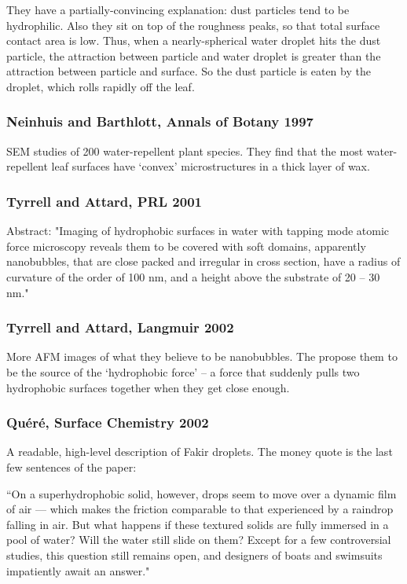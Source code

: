\documentclass{article}
\begin{document}
They have a partially-convincing explanation:  dust particles tend to be hydrophilic.  Also they sit on top of the roughness peaks, so that total surface contact area is low.  Thus, when a nearly-spherical water droplet hits the dust particle, the attraction between particle and water droplet is greater than the attraction between particle and surface. So the dust particle is eaten by the droplet, which rolls rapidly off the leaf.


\subsubsection*{Neinhuis and Barthlott, Annals of Botany 1997}

SEM studies of 200 water-repellent plant species.  They find that the most water-repellent leaf surfaces have `convex' microstructures in a thick layer of wax.


\subsubsection*{Tyrrell and Attard, PRL 2001}

Abstract: "Imaging of hydrophobic surfaces in water with tapping mode atomic force microscopy reveals them to be covered with soft domains, apparently nanobubbles, that are close packed and irregular in cross section, have a radius of curvature of the order of 100 nm, and a height above the substrate of 20 -- 30 nm."

\subsubsection*{Tyrrell and Attard, Langmuir 2002}
More AFM images of what they believe to be nanobubbles. The propose them to be the source of the `hydrophobic force' -- a force that suddenly pulls two hydrophobic surfaces together when they get close enough.

\subsubsection*{Qu\'{e}r\'{e}, Surface Chemistry 2002}
A readable, high-level description of Fakir droplets. The money quote is the last few sentences of the paper:

``On a superhydrophobic solid, however, drops seem to move over a dynamic film of air --- which makes the friction comparable to that experienced by a raindrop falling in air.  But what happens if these textured solids are fully immersed in a pool of water?  Will the water still slide on them?  Except for a few controversial studies, this question still remains open, and designers of boats and swimsuits impatiently await an answer."
\end{document}
